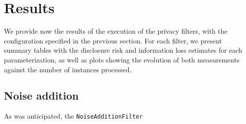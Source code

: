 \section{Results}
\label{Benchmarking:Results}

We provide now the results of the execution of the privacy filters, with the configuration specified in the previous section. For each filter, we present summary tables with the disclosure risk and information loss estimates for each parameterization, as well as plots showing the evolution of both measurements against the number of instances processed.

\subsection{Noise addition}
\label{Benchmarking:Results:Noise}

As was anticipated, the \texttt{NoiseAdditionFilter} 

